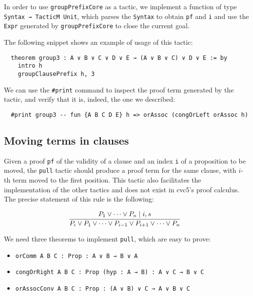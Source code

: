 In order to use \texttt{groupPrefixCore} as a tactic, we implement
a function of type \texttt{Syntax → TacticM Unit}, which parses the \texttt{Syntax}
to obtain \texttt{pf} and \texttt{i} and use the \texttt{Expr} generated by
\texttt{groupPrefixCore} to close the current goal.

The following snippet shows an example of usage of this tactic:

\begin{verbatim}
  theorem group3 : A ∨ B ∨ C ∨ D ∨ E → (A ∨ B ∨ C) ∨ D ∨ E := by
    intro h
    groupClausePrefix h, 3
\end{verbatim}

We can use the \texttt{\#print} command to inspect the proof term generated by the tactic, and
verify that it is, indeed, the one we described:

\begin{verbatim}
  #print group3 -- fun {A B C D E} h => orAssoc (congOrLeft orAssoc h)
\end{verbatim}

\subsection{Moving terms in clauses}

Given a proof \texttt{pf} of the validity of a clause and an index \texttt{i} of a proposition to be moved, the \texttt{pull} tactic should produce a proof term for the same clause,
with $i$-th term moved to the first position. This tactic also facilitates the implementation
of the other tactics and does not exist in cvc5's proof calculus. The precise
statement of this rule is the following:

\[
  \infer[]{P_{i} \vee P_{1} \vee \cdots \vee P_{i - 1} \vee P_{i + 1} \vee \cdots \vee P_{n}}{P_{1} \vee \cdots \vee P_{n}  \mid i, s}
\]


We need three theorems to implement \texttt{pull}, which are easy to prove:

\begin{itemize}
  \item \texttt{orComm {A B C : Prop} : A ∨ B → B ∨ A}
  \item \texttt{congOrRight {A B C : Prop} (hyp : A → B) : A ∨ C → B ∨ C}
  \item \texttt{orAssocConv {A B C : Prop} : (A ∨ B) ∨ C → A ∨ B ∨ C}
\end{itemize}

